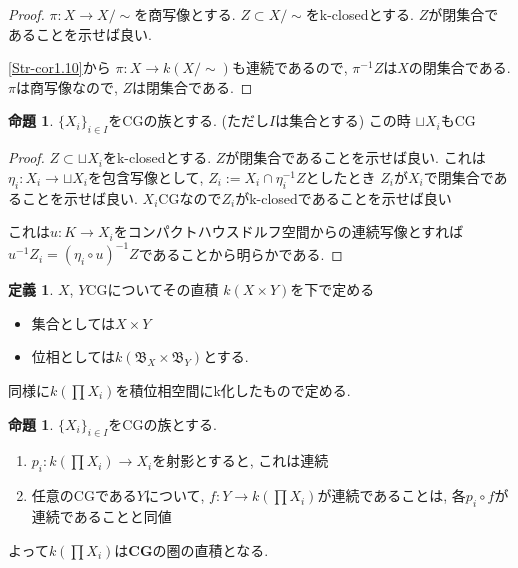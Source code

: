 \documentclass[dvipdfmx,a4paper,11pt]{report}
\theoremstyle{definition}
\newtheorem{prop}[thm]{命題}
\newtheorem{dfn}[thm]{定義}
\begin{document}
\begin{proof}
$\pi : X \to X/\sim$を商写像とする. 
$Z \subset X/\sim$をk-closedとする. $Z$が閉集合であることを示せば良い.

\ref{Str-cor1.10}から
$\pi : X \to k(X/\sim)$も連続であるので, $\pi^{-1}Z$は$X$の閉集合である.
$\pi$は商写像なので, $Z$は閉集合である. 
\end{proof}

 \begin{tcolorbox}
 [colback = white, colframe = green!35!black, fonttitle = \bfseries,breakable = true]
\begin{prop}\cite[Prop2.2]{Str}
\label{Str-prop2.2}
$\{ X_i \}_{i \in I}$をCGの族とする. (ただし$I$は集合とする)
この時
$\sqcup X_i$もCG
\end{prop}
\end{tcolorbox}
\begin{proof}
$Z \subset \sqcup X_i$をk-closedとする.
$Z$が閉集合であることを示せば良い. 
これは$\eta_i : X_i \to \sqcup X_i$を包含写像として, $Z_i := X_i \cap \eta_{i}^{-1}Z$としたとき
$Z_i$が$X_i$で閉集合であることを示せば良い.
$X_i$CGなので$Z_i$がk-closedであることを示せば良い

これは$u : K \to X_i$をコンパクトハウスドルフ空間からの連続写像とすれば
$u^{-1}Z_i = (\eta_i \circ u)^{-1}Z$であることから明らかである. 
\end{proof}


 \begin{tcolorbox}
 [colback = white, colframe = green!35!black, fonttitle = \bfseries,breakable = true]
\begin{dfn}\cite[Def 2.3]{Str}
\label{Str-def-2.3}
$X$, $Y$CGについてその直積
$k(X \times Y)$を下で定める
\begin{itemize}
\item 集合としては$X \times Y$
\item 位相としては$k(\mathfrak{B}_X \times \mathfrak{B}_Y)$とする.
\end{itemize}

同様に$k(\prod X_i)$を積位相空間にk化したもので定める. 
\end{dfn}
\end{tcolorbox}

 \begin{tcolorbox}
 [colback = white, colframe = green!35!black, fonttitle = \bfseries,breakable = true]
\begin{prop}\cite[Prop2.4]{Str}
$\{ X_i \}_{i \in I}$をCGの族とする.
\begin{enumerate}
\item $p_i : k(\prod X_i) \to X_i$を射影とすると, これは連続
\item 任意のCGである$Y$について, $f : Y \to k(\prod X_i)$が連続であることは, 各$p_i \circ f $が連続であることと同値
\end{enumerate}
よって$k(\prod X_i)$は{\bf CG}の圏の直積となる.
\end{prop}
\end{tcolorbox}
\end{document}
